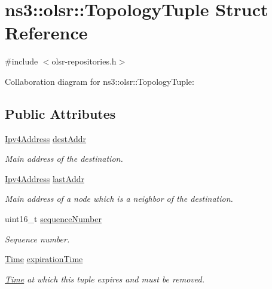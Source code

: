 \hypertarget{structns3_1_1olsr_1_1TopologyTuple}{}\section{ns3\+:\+:olsr\+:\+:Topology\+Tuple Struct Reference}
\label{structns3_1_1olsr_1_1TopologyTuple}


{\ttfamily \#include $<$olsr-\/repositories.\+h$>$}



Collaboration diagram for ns3\+:\+:olsr\+:\+:Topology\+Tuple\+:
\subsection*{Public Attributes}
\begin{DoxyCompactItemize}
\item 
\hyperlink{classns3_1_1Ipv4Address}{Ipv4\+Address} \hyperlink{structns3_1_1olsr_1_1TopologyTuple_a2e7a724a86c97221f9c5f3baacee0eba}{dest\+Addr}
\begin{DoxyCompactList}\small\item\em Main address of the destination. \end{DoxyCompactList}\item 
\hyperlink{classns3_1_1Ipv4Address}{Ipv4\+Address} \hyperlink{structns3_1_1olsr_1_1TopologyTuple_a59d9c733056432b9de9f8becdd9e640d}{last\+Addr}
\begin{DoxyCompactList}\small\item\em Main address of a node which is a neighbor of the destination. \end{DoxyCompactList}\item 
uint16\+\_\+t \hyperlink{structns3_1_1olsr_1_1TopologyTuple_a6f1ff68f2eaef28667bddeeb08c05fce}{sequence\+Number}
\begin{DoxyCompactList}\small\item\em Sequence number. \end{DoxyCompactList}\item 
\hyperlink{classns3_1_1Time}{Time} \hyperlink{structns3_1_1olsr_1_1TopologyTuple_ac567bb92fd21ca445e202dcec2538ecb}{expiration\+Time}
\begin{DoxyCompactList}\small\item\em \hyperlink{classns3_1_1Time}{Time} at which this tuple expires and must be removed. \end{DoxyCompactList}\end{DoxyCompactItemize}



